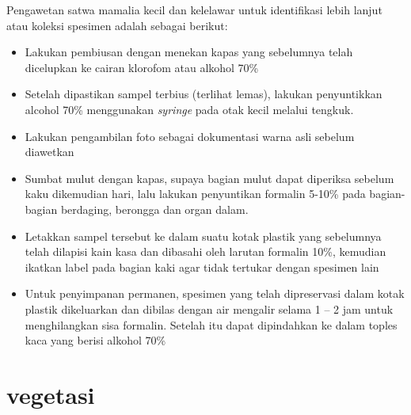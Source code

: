 \documentclass[
]{book}
\providecommand{\tightlist}{%
  \setlength{\itemsep}{0pt}\setlength{\parskip}{0pt}}
\begin{document}
Pengawetan satwa mamalia kecil dan kelelawar untuk identifikasi lebih lanjut atau koleksi spesimen adalah sebagai berikut:

\begin{itemize}
\tightlist
\item
  Lakukan pembiusan dengan menekan kapas yang sebelumnya telah dicelupkan ke cairan klorofom atau alkohol 70\%
\item
  Setelah dipastikan sampel terbius (terlihat lemas), lakukan penyuntikkan alcohol 70\% menggunakan \emph{syringe} pada otak kecil melalui tengkuk.
\item
  Lakukan pengambilan foto sebagai dokumentasi warna asli sebelum diawetkan
\item
  Sumbat mulut dengan kapas, supaya bagian mulut dapat diperiksa sebelum kaku dikemudian hari, lalu lakukan penyuntikan formalin 5-10\% pada bagian-bagian berdaging, berongga dan organ dalam.
\item
  Letakkan sampel tersebut ke dalam suatu kotak plastik yang sebelumnya telah dilapisi kain kasa dan dibasahi oleh larutan formalin 10\%, kemudian ikatkan label pada bagian kaki agar tidak tertukar dengan spesimen lain
\item
  Untuk penyimpanan permanen, spesimen yang telah dipreservasi dalam kotak plastik dikeluarkan dan dibilas dengan air mengalir selama 1 -- 2 jam untuk menghilangkan sisa formalin. Setelah itu dapat dipindahkan ke dalam toples kaca yang berisi alkohol 70\%
\end{itemize}

\hypertarget{vegetasi-1}{%
\section*{vegetasi}\label{vegetasi-1}}
\end{document}
